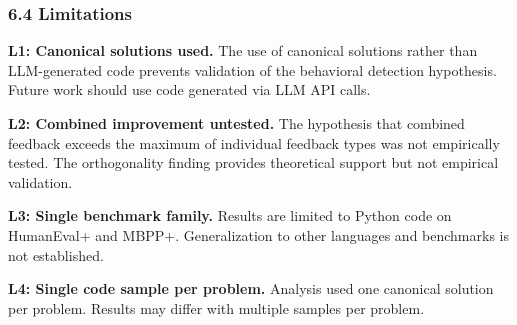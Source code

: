 \subsubsection{6.4 Limitations}

\textbf{L1: Canonical solutions used.} The use of canonical solutions rather than LLM-generated code prevents validation of the behavioral detection hypothesis. Future work should use code generated via LLM API calls.

\textbf{L2: Combined improvement untested.} The hypothesis that combined feedback exceeds the maximum of individual feedback types was not empirically tested. The orthogonality finding provides theoretical support but not empirical validation.

\textbf{L3: Single benchmark family.} Results are limited to Python code on HumanEval+ and MBPP+. Generalization to other languages and benchmarks is not established.

\textbf{L4: Single code sample per problem.} Analysis used one canonical solution per problem. Results may differ with multiple samples per problem.

